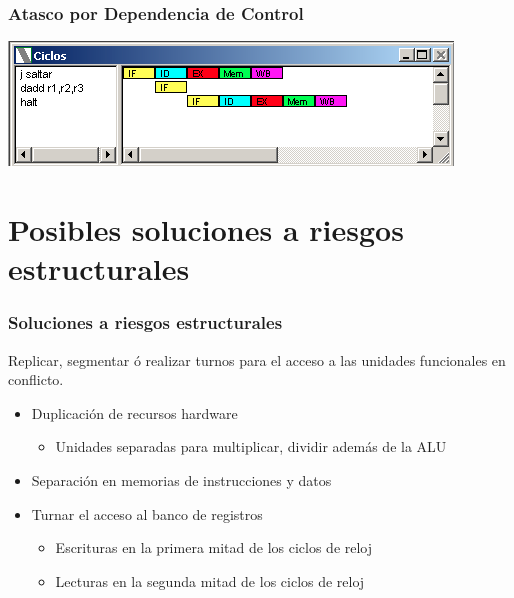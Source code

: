 \documentclass{beamer}
\begin{document}
\begin{frame}[fragile]
\frametitle{Atasco por Dependencia de Control}
\begin{block}{}
\includegraphics[scale=0.45]{atasco-branch-taken.png}
\end{block}
\end{frame}


\section{Posibles soluciones a riesgos estructurales}
\begin{frame}
\frametitle{Soluciones a riesgos estructurales}
Replicar, segmentar ó realizar turnos para el acceso a las unidades funcionales en conflicto.
\begin{itemize}
\item Duplicación de recursos hardware
\begin{itemize}
\item Unidades separadas para multiplicar, dividir además de la ALU
\end{itemize}
\item Separación en memorias de instrucciones y datos
\item Turnar el acceso al banco de registros
\begin{itemize}
\item Escrituras en la primera mitad de los ciclos de reloj
\item Lecturas en la segunda mitad de los ciclos de reloj
\end{itemize}
\end{itemize}
\end{frame}
\end{document}
